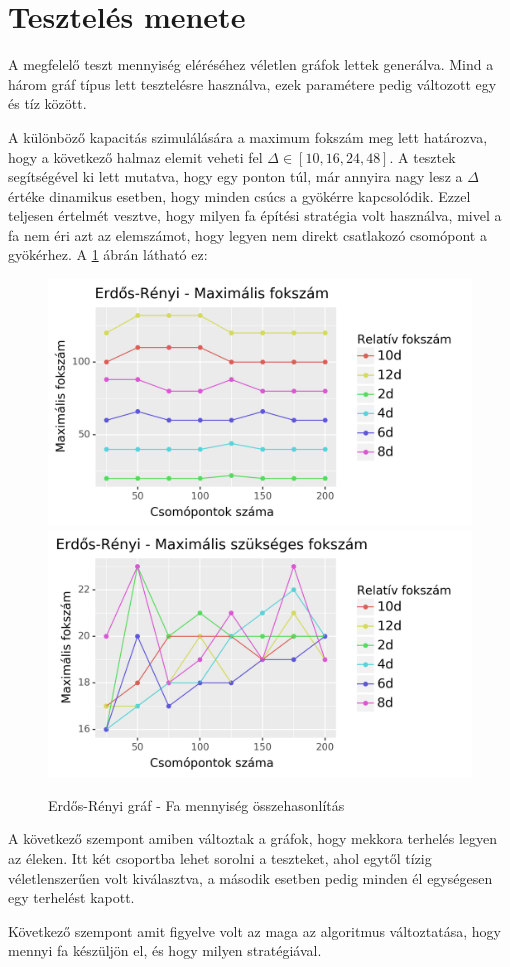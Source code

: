 \documentclass[12pt]{report}
\begin{document}
\section{Tesztelés menete}

A megfelelő teszt mennyiség eléréséhez véletlen gráfok lettek generálva. 
Mind a három gráf típus lett tesztelésre használva, ezek paramétere pedig változott egy és tíz között.

A különböző kapacitás szimulálására a maximum fokszám meg lett határozva, hogy a 
következő halmaz elemit veheti fel $\Delta\in[10, 16, 24, 48]$.
A tesztek segítségével ki lett mutatva, hogy egy ponton túl, már annyira nagy lesz a $\Delta$ értéke dinamikus esetben, hogy minden csúcs a gyökérre kapcsolódik.
Ezzel teljesen értelmét vesztve, hogy milyen fa építési stratégia volt használva, mivel a fa nem éri azt az elemszámot, hogy legyen nem direkt csatlakozó csomópont a gyökérhez. 
A \ref{delta} ábrán látható ez:  

\begin{figure}[H]
	\begin{center}
		\includegraphics[width=0.49\linewidth]{pictures/delta_max.png}
		\includegraphics[width=0.49\linewidth]{pictures/delta_req.png}
		\caption{Erdős-Rényi gráf - Fa mennyiség összehasonlítás}
		\label{delta}
	\end{center}
\end{figure}

A következő szempont amiben változtak a gráfok, hogy mekkora terhelés legyen az éleken.
Itt két csoportba lehet sorolni a teszteket, ahol egytől tízig véletlenszerűen volt kiválasztva, a második esetben pedig minden él egységesen egy terhelést kapott.

Következő szempont amit figyelve volt az maga az algoritmus változtatása, hogy mennyi fa készüljön el, és hogy milyen stratégiával.
\end{document}
